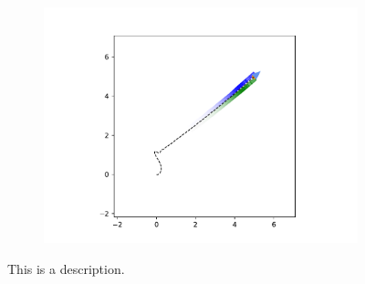\documentclass[main.tex]{subfiles}
\begin{document}
\begin{figure}[h]
\begin{subfigure}{0.20\textwidth}
        \includegraphics[width=\textwidth]{figures/Simulations/sim1/frame_9.pdf}
    \end{subfigure}
    
    \caption[short]{This is a description.}
\end{figure}
\end{document}
